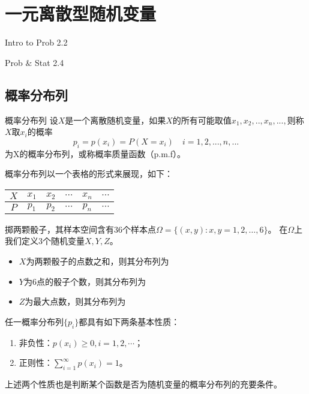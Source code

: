 \chapter{一元离散型随机变量}
\begin{introduction}
  \item Intro to Prob 2.2 
  \item Prob $\&$ Stat 2.4
\end{introduction}

\section{概率分布列}
\begin{definition}{概率分布列} \label{def: pmf} 
设$X$是一个离散随机变量，如果$X$的所有可能取值$x_1,x_2,..,x_n,...,$则称$X$取$x_i$的概率
$$p_i = p(x_i)=P(X = x_i) \quad i=1,2,...,n,...$$
为X的概率分布列，或称概率质量函数（p.m.f）。
\end{definition}
\begin{remark}
    概率分布列以一个表格的形式来展现，如下：
\begin{table}[ht]
\centering
\begin{tabular}{c|c c cc c}
\hline
$X$ & $x_1$ & $x_2$ & $\cdots$ & $x_n$ & $\cdots$ \\
\hline
$P$ & $p_1$ & $p_2$ & $\cdots$ & $p_n$ & $\cdots$\\
\hline
\end{tabular}
\end{table}
\end{remark}

\begin{example}
掷两颗骰子，其样本空间含有36个样本点$\Omega=\{(x, y): x, y=1,2, \ldots, 6\}$。
在$\Omega$上我们定义3个随机变量$X,Y,Z$。
\begin{itemize}
\item $X$为两颗骰子的点数之和，则其分布列为
\vspace{3cm}
\item $Y$为6点的骰子个数，则其分布列为
\vspace{3cm}
\item $Z$为最大点数，则其分布列为
\vspace{3cm}
\end{itemize}
\end{example}
\begin{property}
任一概率分布列$\{p_i\}$都具有如下两条基本性质：
\begin{enumerate}
    \item 非负性：$p(x_i) \geq 0, i=1,2,\cdots$；
    \item 正则性：$\sum_{i=1}^\infty p(x_i) = 1$。
\end{enumerate}
\end{property}
\begin{remark}
    上述两个性质也是判断某个函数是否为随机变量的概率分布列的充要条件。
\end{remark}

